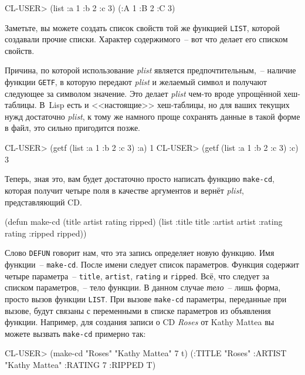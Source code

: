 \begin{myverb}
CL-USER> (list :a 1 :b 2 :c 3)
(:A 1 :B 2 :C 3)
\end{myverb}

Заметьте, вы можете создать список свойств той же функцией \lstinline{LIST}, которой создавали
прочие списки. Характер содержимого~-- вот что делает его списком свойств.

Причина, по которой использование \textit{plist} является предпочтительным,~-- наличие
функции \lstinline{GETF}, в которую передают \textit{plist} и желаемый символ и получают
следующее за символом значение. Это делает \textit{plist} чем-то вроде упрощённой
хеш-таблицы. В~Lisp есть и <<настоящие>> хеш-таблицы, но для ваших текущих нужд достаточно
\textit{plist}, к тому же намного проще сохранять данные в такой форме в файл, это сильно
пригодится позже.

\begin{myverb}
CL-USER> (getf (list :a 1 :b 2 :c 3) :a)
1
CL-USER> (getf (list :a 1 :b 2 :c 3) :c)
3
\end{myverb}

Теперь, зная это, вам будет достаточно просто написать функцию \lstinline{make-cd}, которая
получит четыре поля в качестве аргументов и вернёт \textit{plist}, представляющий CD.

\begin{myverb}
(defun make-cd (title artist rating ripped)
  (list :title title :artist artist :rating rating :ripped ripped))
\end{myverb}

Слово \lstinline{DEFUN} говорит нам, что
эта запись определяет новую функцию. Имя функции~-- \lstinline{make-cd}. После имени следует
список параметров. Функция содержит четыре параметра~-- \lstinline{title}, \lstinline{artist},
\lstinline{rating} и \lstinline{ripped}. Всё, что следует за списком параметров,~-- тело функции. В
данном случае \textit{тело}~-- лишь форма, просто вызов функции \lstinline{LIST}. При вызове
\lstinline{make-сd} параметры, переданные при вызове, будут связаны с переменными в списке
параметров из объявления функции. Например, для создания записи о CD \textit{Roses} от
Kathy Mattea вы можете вызвать \lstinline{make-cd} примерно так:

\begin{myverb}
CL-USER> (make-cd "Roses" "Kathy Mattea" 7 t)
(:TITLE "Roses" :ARTIST "Kathy Mattea" :RATING 7 :RIPPED T) 
\end{myverb}

